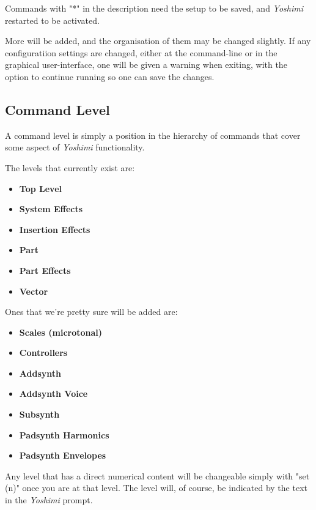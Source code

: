    Commands with "*" in the description need the setup to be saved,
   and \textsl{Yoshimi} restarted to be activated. 

   More will be added, and the organisation of them may be changed slightly.
   If any configuratiion settings are changed, either at the command-line
   or in the graphical user-interface, one will be given a warning when
   exiting, with the option to continue running so one can save the changes.

\subsection{Command Level}
\label{subsec:command_line_command_level}

   A command level is simply a position in the hierarchy of commands that cover
   some aspect of \textsl{Yoshimi} functionality.

   The levels that currently exist are:

   \begin{itemize}
      \item \textbf{Top Level}
      \item \textbf{System Effects}
      \item \textbf{Insertion Effects}
      \item \textbf{Part}
      \item \textbf{Part Effects}
      \item \textbf{Vector}
   \end{itemize}

Ones that we're pretty sure will be added are:

   \begin{itemize}
      \item \textbf{Scales (microtonal)}
      \item \textbf{Controllers}
      \item \textbf{Addsynth}
      \item \textbf{Addsynth Voice}
      \item \textbf{Subsynth}
      \item \textbf{Padsynth Harmonics}
      \item \textbf{Padsynth Envelopes}
   \end{itemize}

   Any level that has a direct numerical content will be changeable simply with
   "set (n)" once you are at that level.  The level will, of course, be
   indicated by the text in the \textsl{Yoshimi} prompt.

